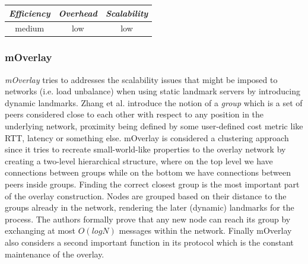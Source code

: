 \begin{center}
\begin{tabular}{ccc}
\emph{Efficiency} & \emph{Overhead} & \emph{Scalability} \\
\hline
medium &
low &
low
\end{tabular}
\end{center}

\subsubsection{mOverlay}
\emph{mOverlay} \cite{ZZZSZ2004} tries to addresses the scalability issues that
might be imposed to networks (i.e. load unbalance) when using static landmark
servers by introducing dynamic landmarks. Zhang et al. introduce the notion of a
\emph{group} which is a set of peers considered close to each other with respect
to any position in the underlying network, proximity being defined by some
user-defined cost metric like RTT, latency or something else. mOverlay is
considered a clustering approach since it tries to recreate small-world-like
properties to the overlay network by creating a two-level hierarchical
structure, where on the top level we have connections between groups while on
the bottom we have connections between peers inside groups. Finding the correct
closest group is the most important part of the overlay construction. Nodes are
grouped based on their distance to the groups already in the network, rendering
the later (dynamic) landmarks for the process. The authors formally prove
that any new node can reach its group by exchanging at most $O(logN)$ messages
within the network. Finally mOverlay also considers a second important function
in its protocol which is the constant maintenance of the overlay.

